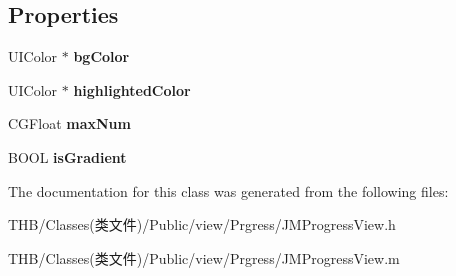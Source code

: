 \subsection*{Properties}
\begin{DoxyCompactItemize}
\item 
\mbox{\label{interface_j_m_progress_view_aed3e87058d0103ee819130ed0937b2e7}} 
U\+I\+Color $\ast$ {\bfseries bg\+Color}
\item 
\mbox{\label{interface_j_m_progress_view_ad55e70833556c31c6682c08be9cbad45}} 
U\+I\+Color $\ast$ {\bfseries highlighted\+Color}
\item 
\mbox{\label{interface_j_m_progress_view_a3928a7bc7588dd495368b8f609eed3c4}} 
C\+G\+Float {\bfseries max\+Num}
\item 
\mbox{\label{interface_j_m_progress_view_a979b67b251dcb14f6099190144f875e5}} 
B\+O\+OL {\bfseries is\+Gradient}
\end{DoxyCompactItemize}


The documentation for this class was generated from the following files\+:\begin{DoxyCompactItemize}
\item 
T\+H\+B/\+Classes(类文件)/\+Public/view/\+Prgress/J\+M\+Progress\+View.\+h\item 
T\+H\+B/\+Classes(类文件)/\+Public/view/\+Prgress/J\+M\+Progress\+View.\+m\end{DoxyCompactItemize}
